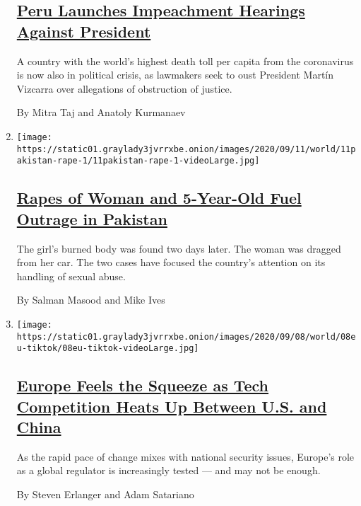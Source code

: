 \begin{enumerate}
  \hypertarget{peru-launches-impeachment-hearings-against-president}{%
  \subsection{\texorpdfstring{\href{/2020/09/11/world/americas/peru-impeachment-president-martin-vizcarra.html}{Peru
  Launches Impeachment Hearings Against
  President}}{Peru Launches Impeachment Hearings Against President}}\label{peru-launches-impeachment-hearings-against-president}}

  A country with the world's highest death toll per capita from the
  coronavirus is now also in political crisis, as lawmakers seek to oust
  President Martín Vizcarra over allegations of obstruction of justice.

  By Mitra Taj and Anatoly Kurmanaev
\item
  \texttt{[image: https://static01.graylady3jvrrxbe.onion/images/2020/09/11/world/11pakistan-rape-1/11pakistan-rape-1-videoLarge.jpg]}

  \hypertarget{rapes-of-woman-and-5-year-old-fuel-outrage-in-pakistan}{%
  \subsection{\texorpdfstring{\href{/2020/09/11/world/asia/pakistan-rape-5-year-old-lahore-karachi.html}{Rapes
  of Woman and 5-Year-Old Fuel Outrage in
  Pakistan}}{Rapes of Woman and 5-Year-Old Fuel Outrage in Pakistan}}\label{rapes-of-woman-and-5-year-old-fuel-outrage-in-pakistan}}

  The girl's burned body was found two days later. The woman was dragged
  from her car. The two cases have focused the country's attention on
  its handling of sexual abuse.

  By Salman Masood and Mike Ives
\item
  \texttt{[image: https://static01.graylady3jvrrxbe.onion/images/2020/09/08/world/08eu-tiktok/08eu-tiktok-videoLarge.jpg]}

  \hypertarget{europe-feels-the-squeeze-as-tech-competition-heats-up-between-us-and-china}{%
  \subsection{\texorpdfstring{\href{/2020/09/11/world/europe/eu-us-china-technology.html}{Europe
  Feels the Squeeze as Tech Competition Heats Up Between U.S. and
  China}}{Europe Feels the Squeeze as Tech Competition Heats Up Between U.S. and China}}\label{europe-feels-the-squeeze-as-tech-competition-heats-up-between-us-and-china}}

  As the rapid pace of change mixes with national security issues,
  Europe's role as a global regulator is increasingly tested --- and may
  not be enough.

  By Steven Erlanger and Adam Satariano
\end{enumerate}

